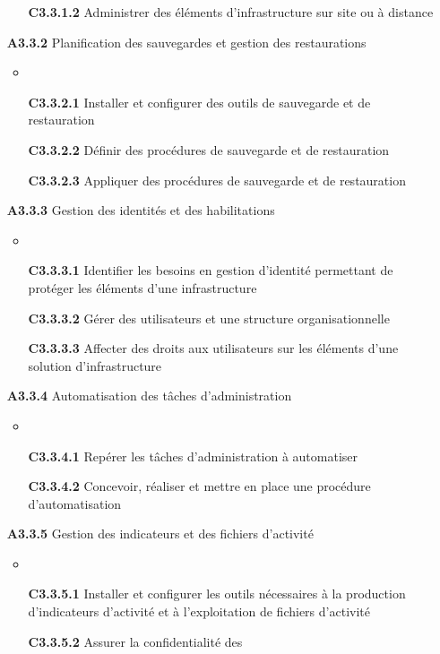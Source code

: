 \documentclass[12pt,a4paper,oneside,titlepage,final]{article}
\begin{document}
\begin{enumerate}
\begin{itemize}
    \item [\textbf{C3.3.1.2}] Administrer des éléments
    d'infrastructure sur site ou à distance
  \end{itemize}
  \item [\textbf{A3.3.2}] Planification des sauvegardes et gestion des
  restaurations
  \begin{itemize}
    \item \item [\textbf{C3.3.2.1}] Installer et configurer des outils
    de sauvegarde et de restauration
    \item [\textbf{C3.3.2.2}] Définir des procédures de sauvegarde et
    de restauration
    \item [\textbf{C3.3.2.3}] Appliquer des procédures de sauvegarde
    et de restauration
  \end{itemize}
  \item [\textbf{A3.3.3}] Gestion des identités et des habilitations
  \begin{itemize}
    \item \item [\textbf{C3.3.3.1}] Identifier les besoins en gestion
    d'identité permettant de protéger les éléments d'une
    infrastructure
    \item [\textbf{C3.3.3.2}] Gérer des utilisateurs et une structure
    organisationnelle
    \item [\textbf{C3.3.3.3}] Affecter des droits aux utilisateurs sur
    les éléments d'une solution d'infrastructure
  \end{itemize}
  \item [\textbf{A3.3.4}] Automatisation des tâches d'administration
  \begin{itemize}
    \item \item [\textbf{C3.3.4.1}] Repérer les tâches
    d'administration à automatiser
    \item [\textbf{C3.3.4.2}] Concevoir, réaliser et mettre en place
    une procédure d'automatisation
  \end{itemize}
  \item [\textbf{A3.3.5}] Gestion des indicateurs et des fichiers
  d'activité
  \begin{itemize}
    \item \item [\textbf{C3.3.5.1}] Installer et configurer les outils
    nécessaires à la production d'indicateurs d'activité et à
    l'exploitation de fichiers d'activité
    \item [\textbf{C3.3.5.2}] Assurer la confidentialité des

\end{itemize}
\end{enumerate}
\end{document}
